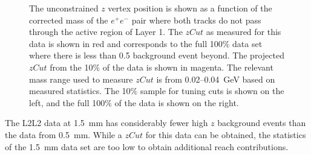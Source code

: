 \begin{figure}[hbt]
  \caption[$z$ vertex and mass distribution for the L2L2 data set with the SVT at $\pm1.5$~mm]{The unconstrained $z$ vertex position is shown as a function of the corrected mass
of the $e^+e^-$ pair where both tracks do not pass through the active region of Layer 1. The $zCut$ as measured for this data is shown in red
and corresponds to the full 100$\%$ data set where there is less than 0.5 background event beyond. The projected $zCut$ from the 10$\%$ of the data is shown in magenta. The relevant mass range used to measure $zCut$ is from 0.02--0.04~GeV based on measured statistics. The 10$\%$ sample for tuning cuts is shown on the left, and the full 100$\%$ of the data is shown on the right.}
  \label{fig:zvm_l2l2_1p5}
\end{figure}
The L2L2 data at 1.5~mm has considerably fewer high $z$ background events than the data from 0.5~mm. While a $zCut$ for this data can be obtained, the statistics of the 1.5~mm data set are too low to obtain additional reach contributions. 